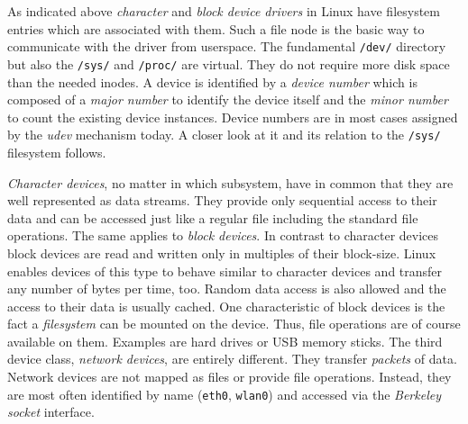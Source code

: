 As indicated above \textit{character} and \textit{block device drivers} in Linux have filesystem entries which are associated with them.
Such a file node is the basic way to communicate with the driver from userspace.
The fundamental \texttt{/dev/} directory but also the \texttt{/sys/} and \texttt{/proc/} are virtual.
They do not require more disk space than the needed inodes.
A device is identified by a \textit{device number} which is composed of a \textit{major number} to identify the device itself and the \textit{minor number} to count the existing device instances\cite{lfd430}.
Device numbers are in most cases assigned by the \textit{udev} mechanism today.
A closer look at it and its relation to the \texttt{/sys/} filesystem follows.

\textit{Character devices}, no matter in which subsystem, have in common that they are well represented as data streams.
They provide only sequential access to their data and can be accessed just like a regular file including the standard file operations\cite{lfd430}.
The same applies to \textit{block devices}.
In contrast to character devices block devices are read and written only in multiples of their block-size.
Linux enables devices of this type to behave similar to character devices and transfer any number of bytes per time, too\cite{lfd430}.
Random data access is also allowed and the access to their data is usually cached.
One characteristic of block devices is the fact a \textit{filesystem} can be mounted on the device.
Thus, file operations are of course available on them.
Examples are hard drives or USB memory sticks\cite{lfd430}.
The third device class, \textit{network devices}, are entirely different.
They transfer \textit{packets} of data.
Network devices are not mapped as files or provide file operations.
Instead, they are most often identified by name (\texttt{eth0}, \texttt{wlan0}) and accessed via the \textit{Berkeley socket} interface\cite{lfd430}.


